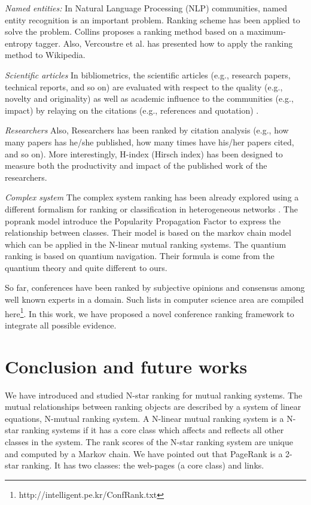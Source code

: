 \documentclass[10pt,leqno,twoside]{article}
\begin{document}
\textit{Named entities:}
In Natural Language Processing (NLP) communities, named entity recognition is an important problem.
Ranking scheme has been applied to solve the problem. Collins \cite{Collins-ACL-02} proposes a ranking method based on a maximum-entropy tagger. Also,
Vercoustre et al. \cite{Vercoustre-SAC-08} has presented how to apply the ranking method to Wikipedia.

\textit{Scientific articles}
In bibliometrics, the scientific articles (e.g., research papers, technical reports, and so on) are evaluated with respect to the quality (e.g., novelty and originality) as well as academic influence to the communities (e.g., impact) by relaying on the citations (e.g., references and quotation) \cite{Cronin-JIS-01}.

\textit{Researchers}
Also, Researchers has been ranked by citation analysis (e.g., how many papers has he/she published, how many times have his/her papers cited, and so on). More interestingly, H-index (Hirsch index) has been designed to
measure both the productivity and impact of the published work of the researchers.

\textit{Complex system}
The complex system ranking has been already explored using a different formalism for ranking or classification in heterogeneous networks \cite{poprank,complexrank}.
The poprank model \cite{poprank} introduce the Popularity Propagation Factor to express the relationship between classes. Their model is based on the markov chain model which can be applied in the N-linear mutual ranking systems. The quantium ranking \cite{complexrank} is based on quantium navigation. Their formula is come from the quantium theory and quite different to ours.

So far, conferences have been ranked by subjective opinions and consensus among well known experts in a domain.
Such lists in computer science area are compiled here\footnote{http://intelligent.pe.kr/ConfRank.txt}.
In this work, we have proposed a novel conference ranking framework to integrate all possible evidence.



\section{Conclusion and future works}\label{Sect:Conclusion}
We have introduced and studied N-star ranking for mutual ranking systems. The mutual relationships between ranking objects are described by a system of linear equations, N-mutual ranking system. A N-linear mutual ranking system is a N-star ranking systems if it has a core class which affects and reflects all other classes in the system. The rank scores of the N-star ranking system are unique and computed by a Markov chain. We have pointed out that PageRank is a 2-star ranking. It has two classes:  the web-pages (a core class) and links.
\end{document}
